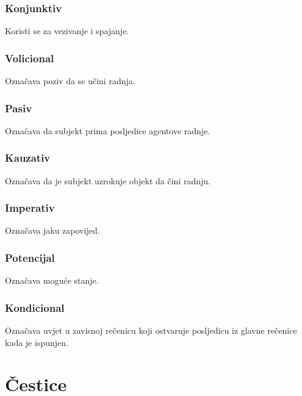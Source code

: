 \documentclass[a4paper, 12pt]{amsart}
\begin{document}
  \subsubsection*{Konjunktiv}
  Koristi se za vezivanje i spajanje.

  \subsubsection*{Volicional}
  Označava poziv da se učini radnja.

  \subsubsection*{Pasiv}
  Označava da subjekt prima posljedice agentove radnje.

  \subsubsection*{Kauzativ}
  Označava da je subjekt uzrokuje objekt da čini radnju.

  \subsubsection*{Imperativ}
  Označava jaku zapovijed.

  \subsubsection*{Potencijal}
  Označava moguće stanje.

  \subsubsection*{Kondicional}
  Označava uvjet u zavisnoj rečenicu koji ostvaruje posljedicu iz glav\-ne rečenice kada je ispunjen.

  \section{Čestice}
\end{document}
